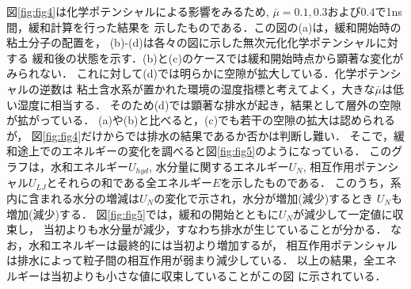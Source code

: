 図\ref{fig:fig4}は化学ポテンシャルによる影響をみるため,
$\bar{\mu}=0.1, 0.3$および$0.4$で1ns間，緩和計算を行った結果を
示したものである．この図の(a)は，緩和開始時の粘土分子の配置を，
(b)-(d)は各々の図に示した無次元化化学ポテンシャルに対する
緩和後の状態を示す．(b)と(c)のケースでは緩和開始時点から顕著な変化がみられない．
これに対して(d)では明らかに空隙が拡大している．化学ポテンシャルの逆数は
粘土含水系が置かれた環境の湿度指標と考えてよく，大きな$\bar{\mu}$は低い湿度に相当する．
そのため(d)では顕著な排水が起き，結果として層外の空隙が拡がっている．
(a)や(b)と比べると，(c)でも若干の空隙の拡大は認められるが，
図\ref{fig:fig4}だけからでは排水の結果であるか否かは判断し難い．
そこで，緩和途上でのエネルギーの変化を調べると図\ref{fig:fig5}のようになっている．
このグラフは，水和エネルギー$U_{hyd}$, 水分量に関するエネルギー$U_{N}$,
相互作用ポテンシャル$U_{LJ}$とそれらの和である全エネルギー$E$を示したものである．
このうち，系内に含まれる水分の増減は$U_{N}$の変化で示され，水分が増加(減少)するとき
$U_N$も増加(減少)する．
図\ref{fig:fig5}では，緩和の開始とともに$U_{N}$が減少して一定値に収束し，
当初よりも水分量が減少，すなわち排水が生じていることが分かる．
なお，水和エネルギーは最終的には当初より増加するが，
相互作用ポテンシャルは排水によって粒子間の相互作用が弱まり減少している．
以上の結果，全エネルギーは当初よりも小さな値に収束していることがこの図
に示されている．

